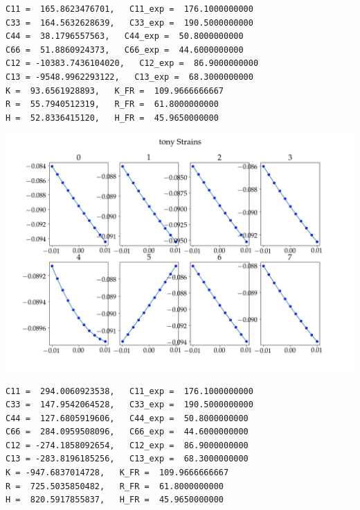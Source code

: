 \documentclass[11pt]{article}
\begin{document}
\begin{enumerate}
\begin{enumerate}
\begin{verbatim}
C11 =  165.8623476701,   C11_exp =  176.1000000000
C33 =  164.5632628639,   C33_exp =  190.5000000000
C44 =  38.1796557563,   C44_exp =  50.8000000000
C66 =  51.8860924373,   C66_exp =  44.6000000000
C12 = -10383.7436104020,   C12_exp =  86.9000000000
C13 = -9548.9962293122,   C13_exp =  68.3000000000
K =  93.6561928893,   K_FR =  109.9666666667
R =  55.7940512319,   R_FR =  61.8000000000
H =  52.8336415120,   H_FR =  45.9650000000

\end{verbatim}

\begin{center}
\includegraphics[width=.9\linewidth]{Images/tonystrains.png}
\end{center}
\begin{verbatim}
C11 =  294.0060923538,   C11_exp =  176.1000000000
C33 =  147.9542064528,   C33_exp =  190.5000000000
C44 =  127.6805919606,   C44_exp =  50.8000000000
C66 =  284.0959508096,   C66_exp =  44.6000000000
C12 = -274.1858092654,   C12_exp =  86.9000000000
C13 = -283.8196185256,   C13_exp =  68.3000000000
K = -947.6837014728,   K_FR =  109.9666666667
R =  725.5035850482,   R_FR =  61.8000000000
H =  820.5917855837,   H_FR =  45.9650000000

\end{verbatim}


\end{enumerate}
\end{enumerate}
\end{document}
